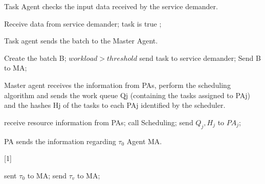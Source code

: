 \begin{algorithm}
    \caption{Task Agent checks the input data received by the service demander.}
    \label{listing1}
    \begin{algorithmic}[1]
        \State Receive data from service demander;
        \If
            {task is true} 
        ;
        \EndIf
        \EndProcedure
    \end{algorithmic} 
\end{algorithm}

\begin{algorithm}
    \caption{Task agent sends the batch to the Master Agent.}
    \label{listing2}
    \begin{algorithmic}[1]
        \State Create the batch B;
            \If
                {$workload > threshold$}  {send task to service demander;}
            \EndIf
        \EndFor
        \State Send B to MA;
        \EndProcedure
    \end{algorithmic} 
\end{algorithm}

\begin{algorithm}
    \caption{Master agent receives the information from PAs, perform the scheduling algorithm and sends the work queue Qj (containing the tasks assigned to PAj) and the hashes Hj of the tasks to each PAj identified by the scheduler.}
    \label{listing3}
    \begin{algorithmic}[1]
        \State receive resource information from PAs;
        \State call Scheduling;
        \State send $Q_j,H_j$ to $PA_j$;
        \EndProcedure
    \end{algorithmic} 
\end{algorithm}

\begin{algorithm}
    \caption{PA sends the information regarding $\tau_0$ Agent MA.}[1]
    \label{listing4}
    \begin{algorithmic}
            \Return sent $\tau_0$ to MA;
            \Return send $\tau_v$ to MA;
        \EndIf
        \EndProcedure
    \end{algorithmic} 
\end{algorithm}

